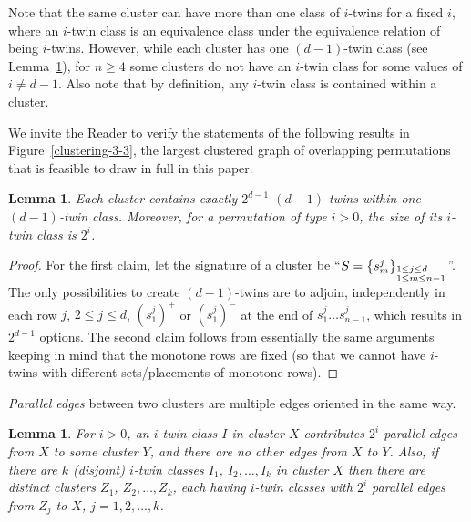 \documentclass[12pt]{article}
\newtheorem{lem}[thm]{Lemma}
\begin{document}
Note that the same cluster can have more than one class of $i$-twins for a fixed $i$, where an $i$-twin class is an equivalence class under the equivalence relation of being $i$-twins.  However, while each cluster has one $(d-1)$-twin class (see Lemma~\ref{lem1}), for $n\geq 4$ some clusters do not have an $i$-twin class for some values of  $i\neq d-1$. 
Also note that by definition, any $i$-twin class is contained within a cluster. 

We invite the Reader to verify the statements of the following results in Figure~\ref{clustering-3-3}, the largest clustered graph of overlapping permutations that is feasible to draw in full in this paper. 

\begin{lem}\label{lem1}  Each cluster contains exactly $2^{d-1}$ $(d-1)$-twins within one $(d-1)$-twin class. Moreover, for a permutation of type $i>0$, the size of its $i$-twin class is $2^i$. \end{lem}

\begin{proof} For the first claim, let the signature of a cluster  be ``$S=\left\{s^j_m\right\}_{\begin{subarray}{l} 1 \leq j\leq d \\ 1\le m\le n-1\end{subarray}}$''. The only possibilities to create $(d-1)$-twins are to adjoin, independently in each row $j$, $2\leq j\leq d$, $(s^j_1)^{+}$ or $(s^j_1)^{-}$ at the end of $s^j_1\ldots s^j_{n-1}$, which results in $2^{d-1}$ options. The second claim follows from  essentially the same arguments keeping in mind that the monotone rows are fixed (so that we cannot have $i$-twins with different sets/placements of monotone rows).\end{proof}

{\em Parallel edges} between two clusters are multiple edges oriented in the same way. 

\begin{lem}\label{lem2} For $i>0$, an $i$-twin class $I$ in cluster $X$ contributes $2^i$ parallel edges from $X$ to some cluster $Y$, and there are no other edges from $X$ to $Y$. Also, if there are $k$ (disjoint) $i$-twin classes $I_1$, $I_2,\ldots,I_k$ in cluster $X$ then there are distinct clusters $Z_1$, $Z_2,\ldots,Z_k$, each having $i$-twin classes with $2^i$ parallel edges from $Z_j$ to $X$, $j=1,2,\ldots,k$. \end{lem}
\end{document}
